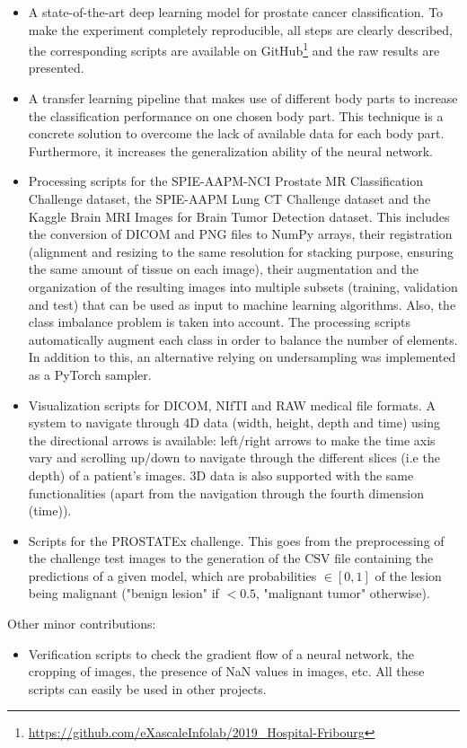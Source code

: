 \begin{itemize}
\item A state-of-the-art deep learning model for prostate cancer classification. To make the experiment completely reproducible, all steps are clearly described, the corresponding scripts are available on GitHub\footnote{\url{https://github.com/eXascaleInfolab/2019_Hospital-Fribourg}} and the raw results are presented. 

\item A transfer learning pipeline that makes use of different body parts to increase the classification performance on one chosen body part. This technique is a concrete solution to overcome the lack of available data for each body part. Furthermore, it increases the generalization ability of the neural network.

\item Processing scripts for the SPIE-AAPM-NCI Prostate MR Classification Challenge dataset, the SPIE-AAPM Lung CT Challenge dataset and the Kaggle Brain MRI Images for Brain Tumor Detection dataset. This includes the conversion of DICOM and PNG files to NumPy arrays, their registration (alignment and resizing to the same resolution for stacking purpose, ensuring the same amount of tissue on each image), their augmentation and the organization of the resulting images into multiple subsets (training, validation and test) that can be used as input to machine learning algorithms. Also, the class imbalance problem is taken into account. The processing scripts automatically augment each class in order to balance the number of elements. In addition to this, an alternative relying on undersampling was implemented as a PyTorch sampler.

\item Visualization scripts for DICOM, NIfTI and RAW medical file formats. A system to navigate through 4D data (width, height, depth and time) using the directional arrows is available: left/right arrows to make the time axis vary and scrolling up/down to navigate through the different slices (i.e the depth) of a patient's images. 3D data is also supported with the same functionalities (apart from the navigation through the fourth dimension (time)). 

\item Scripts for the PROSTATEx challenge. This goes from the preprocessing of the challenge test images to the generation of the CSV file containing the predictions of a given model, which are probabilities $\in [0,1]$ of the lesion being malignant ("benign lesion" if $< 0.5$, "malignant tumor" otherwise).

\end{itemize}
Other minor contributions:
\begin{itemize}
\item Verification scripts to check the gradient flow of a neural network, the cropping of images, the presence of NaN values in images, etc. All these scripts can easily be used in other projects.
\end{itemize}


